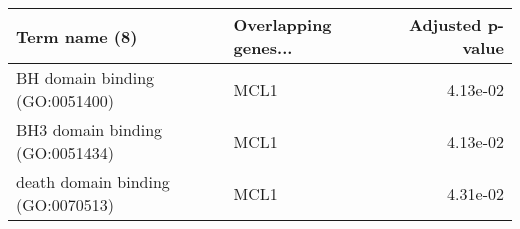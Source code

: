 \begin{tabular}{llr}
\toprule
                    Term name (8) & Overlapping genes... &  Adjusted p-value \\
\midrule
   BH domain binding (GO:0051400) &                 MCL1 &          4.13e-02 \\
  BH3 domain binding (GO:0051434) &                 MCL1 &          4.13e-02 \\
death domain binding (GO:0070513) &                 MCL1 &          4.31e-02 \\
\bottomrule
\end{tabular}
